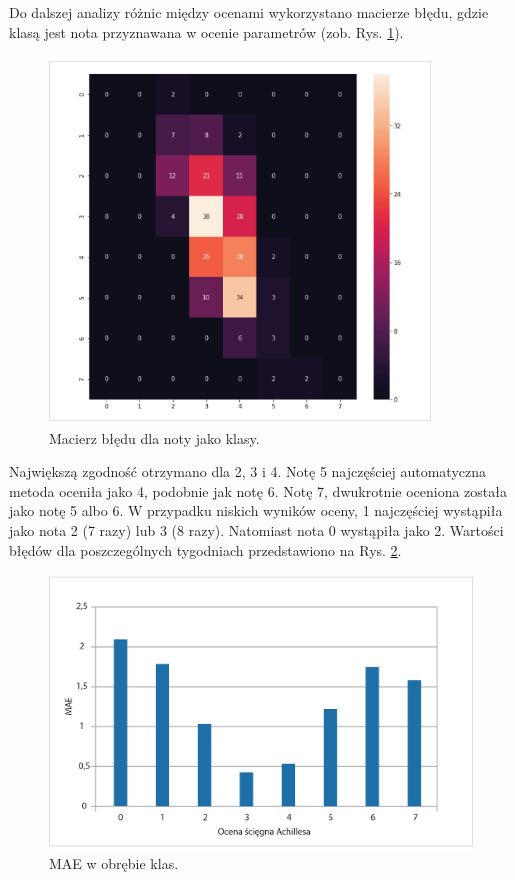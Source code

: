 Do dalszej analizy różnic między ocenami wykorzystano macierze błędu, gdzie klasą jest nota przyznawana w ocenie parametrów (zob. Rys. \ref{fig:cmscores}).
\begin{figure}[h]
	\centering
	\includegraphics[width=0.9\textwidth]{figures/cmScores.jpg}
	\caption{Macierz błędu dla noty jako klasy.}\label{fig:cmscores}
\end{figure}

Największą zgodność otrzymano dla 2, 3 i 4. Notę 5 najczęściej automatyczna metoda oceniła jako 4, podobnie jak notę 6. Notę 7, dwukrotnie oceniona została jako notę 5 albo 6. W przypadku niskich wyników oceny, 1 najczęściej wystąpiła jako nota 2 (7 razy) lub 3 (8 razy). Natomiast nota 0 wystąpiła jako 2. Wartości błędów dla poszczególnych tygodniach przedstawiono na Rys. \ref{fig:cmscores_summary}.

\begin{figure}[h]
	\centering
	\includegraphics[width=1\textwidth]{figures/cmScores_summary.jpg}
	\caption{MAE w obrębie klas.}\label{fig:cmscores_summary}
\end{figure}

